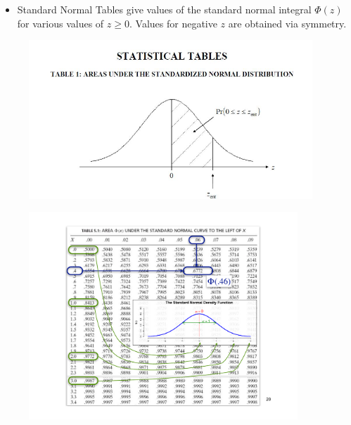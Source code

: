 \documentclass[notes=show,smaller,handout]{beamer}\usepackage[]{graphicx}\usepackage[]{color}
\newenvironment{stepitemize}{\begin{itemize}[<+->]}{\end{itemize} }
\begin{document}
\begin{frame}{\secname}


\begin{stepitemize}
\item Standard Normal Tables give values of the standard normal integral $\Phi(z)$ for various values of $z\geq 0$.  Values for negative $z$ are obtained via symmetry.
\end{stepitemize}


\begin{figure}[ptb]\centering
\includegraphics[width=0.95\textwidth,height=0.75\textheight]{img/bell_curve__5.pdf}%
\end{figure}%
\end{frame}%


\begin{frame}{\secname}
\begin{figure}[ptb]\centering
\includegraphics[width=0.9\textwidth,height=0.95\textheight]{img/myTableGauss.pdf}%
\end{figure}%
\end{frame}%
\end{document}
